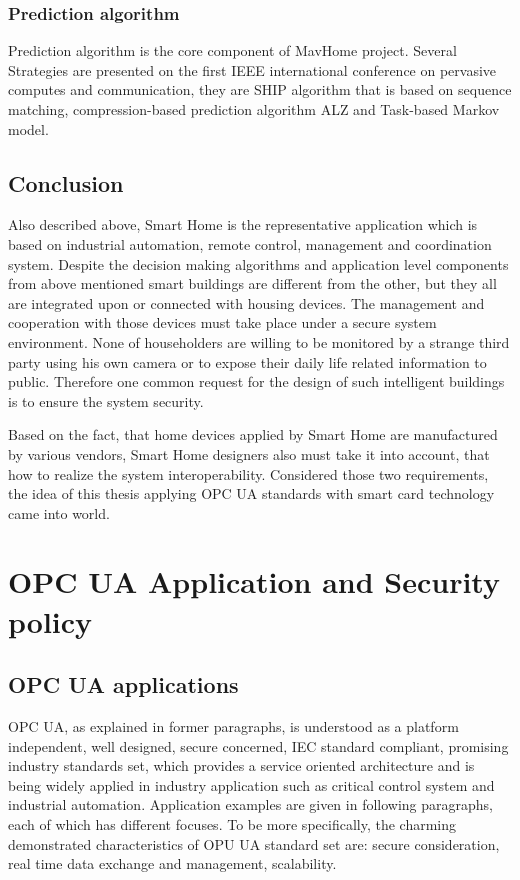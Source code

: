\subsubsection{Prediction algorithm}
Prediction algorithm is the core component of MavHome project. Several Strategies are presented on the first IEEE international conference on pervasive computes and communication, they are SHIP algorithm that is based on sequence matching, compression-based prediction algorithm ALZ and Task-based Markov model\cite{smart_home_agent}.

\subsection{Conclusion}
Also described above, Smart Home is the representative application which is based on industrial automation, remote control, management and coordination system. Despite the decision making algorithms and application level components from above mentioned smart buildings are different from the other, but they all are integrated upon or connected with housing devices. The management and cooperation with those devices must take place under a secure system environment. None of householders are willing to be monitored by a strange third party using his own camera or to expose their daily life related information to public. Therefore one common request for the design of such intelligent buildings is to ensure the system security.

Based on the fact, that home devices applied by Smart Home are manufactured by various vendors,  Smart Home designers also must take it into account, that how to realize the system interoperability. Considered those two requirements, the idea of this thesis applying OPC UA standards with smart card technology came into world. 

\section{OPC UA Application and Security policy }

\subsection{OPC UA applications}
OPC UA, as explained in former paragraphs,  is understood as a platform independent, well designed, secure concerned, IEC standard compliant, promising industry standards set, which provides a service oriented architecture and is being widely applied in industry application such as critical control system and industrial automation. Application examples are given in following paragraphs, each of which has different focuses. To be more specifically, the charming demonstrated characteristics of OPU UA standard set are: secure consideration, real time data exchange and management, scalability. 

